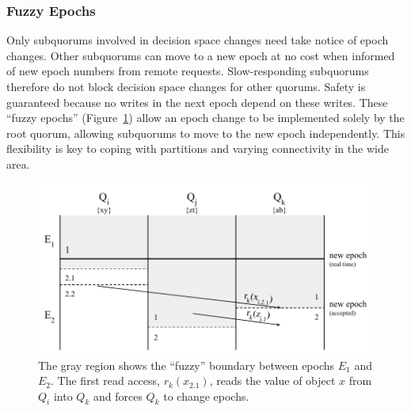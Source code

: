 \documentclass[11pt,letterpaper]{article}
\begin{document}
\subsubsection{Fuzzy Epochs}
\vspace{-.5em}

Only subquorums involved in decision space changes need take notice of
epoch changes.
Other subquorums can move to a new epoch at no cost when informed of new epoch
numbers from remote requests.
Slow-responding subquorums therefore do not block decision space changes for other
quorums.
Safety is guaranteed because no writes in the next epoch depend on these writes.
These ``fuzzy epochs'' (Figure~\ref{fig:fuzzy}) allow an epoch change to be implemented solely by the
root quorum, allowing subquorums to move to the new epoch independently.
This flexibility is key to coping with partitions and varying connectivity in
the wide area.
\begin{figure}[t]
\vspace{-.5in}
    \centering
    \includegraphics[height=0.2\textheight]{figures/fuzzy}
    \caption{The gray region shows the ``fuzzy'' boundary between epochs $E_1$
      and $E_2$. The first read access, $r_k(x_{2.1})$, reads the value of object $x$ from $Q_i$ into
      $Q_k$ and forces $Q_k$ to change epochs.}
    \label{fig:fuzzy}
\end{figure}
\end{document}
